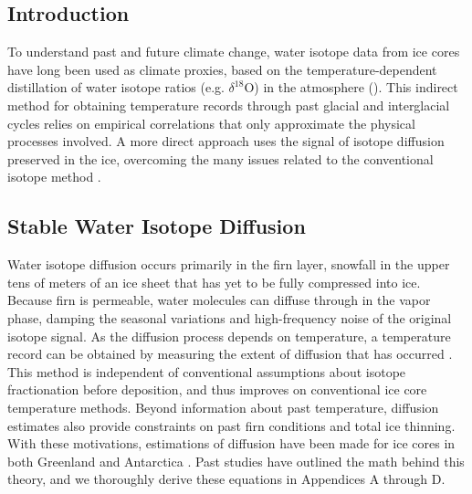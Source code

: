 \documentclass[draft, jgrga]{AGUTeX}
\begin{document}


\begin{article}

\section{Introduction}

To understand past and future climate change, water isotope data from ice cores have long been used as climate proxies, based on the temperature-dependent distillation of water isotope ratios (e.g. $\delta^{18}$O) in the atmosphere (\citep{Epstein1951,Dansgaard1954,Dansgaard1964}). This indirect method for obtaining temperature records through past glacial and interglacial cycles relies on empirical correlations that only approximate the physical processes involved. A more direct approach uses the signal of isotope diffusion preserved in the ice, overcoming the many issues related to the conventional
isotope method \citep{Johnsen2000}.

\subsection{Stable Water Isotope Diffusion}

Water isotope diffusion occurs primarily in the firn layer, snowfall in the upper tens of meters of an ice sheet that has yet to be fully compressed into ice. Because firn is permeable, water molecules can diffuse through in the vapor phase, damping the seasonal variations and high-frequency noise of the original isotope signal. As the diffusion process depends on temperature, a temperature record can be obtained by measuring the extent of diffusion that has occurred \citep{Johnsen2000}. This method is independent of conventional assumptions about isotope fractionation before deposition, and thus improves on conventional ice core temperature methods. Beyond information about past temperature, diffusion estimates also provide constraints on past firn conditions and total ice thinning. With these motivations, estimations of diffusion have been made for ice cores in both Greenland and Antarctica \citep{Simonsen2011,Gkinis2014,vanderWel2015,Jones2017a,Holme2017}. Past studies have outlined the math behind this theory, and we thoroughly derive these equations in Appendices A through D.


\end{article}
\end{document}
